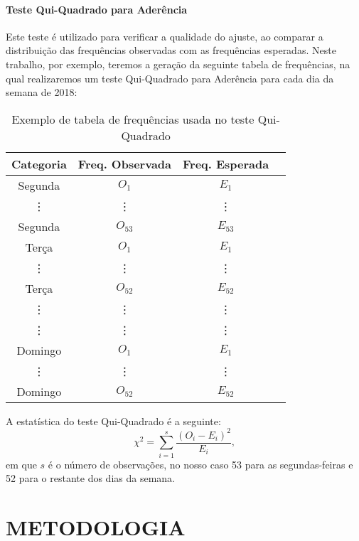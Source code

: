 \documentclass[
	12pt,
	openright,			%
	twoside,			%
	a4paper,			%
	chapter=TITLE,		%
	section=TITLE,		%
	subsection=TITLE,	%
	subsubsection=TITLE,%
	english,			%
	french,				%
	spanish,			%
	brazil				%
	]{abntex2}
\begin{document}
\subsubsection{Teste Qui-Quadrado para Aderência}
Este teste é utilizado para verificar a qualidade do ajuste, ao comparar a distribuição das frequências observadas com as frequências esperadas.
Neste trabalho, por exemplo, teremos a geração da seguinte tabela de frequências, na qual realizaremos um teste Qui-Quadrado para Aderência para cada dia da semana de 2018:
\begin{table}[H]
    \centering
    \begin{tabular}{ |c|c|c|c| }
    \hline
    Categoria & Freq. Observada & Freq. Esperada \\
    \hline
    Segunda & $O_1$ & $E_1$ \\
    \vdots & \vdots & \vdots \\
    Segunda & $O_{53}$ & $E_{53}$ \\
    Terça & $O_1$ & $E_1$ \\
    \vdots & \vdots & \vdots \\
    Terça & $O_{52}$ & $E_{52}$ \\
    \vdots & \vdots & \vdots \\
    \vdots & \vdots & \vdots \\
    Domingo & $O_1$ & $E_1$ \\
    \vdots & \vdots & \vdots \\
    Domingo & $O_{52}$ & $E_{52}$ \\
    \hline
    \end{tabular}
    \caption{Exemplo de tabela de frequências usada no teste Qui-Quadrado}
    \label{tab:my_label}
\end{table}

A estatística do teste Qui-Quadrado é a seguinte:
\begin{equation}
    \chi^2 = \sum_{i=1}^{s}\frac{(O_{i} - E_{i})^2}{E_{i}},
\end{equation}
em que $s$ é o número de observações, no nosso caso 53 para as segundas-feiras e 52 para o restante dos dias da semana.

\chapter{METODOLOGIA}
\end{document}
